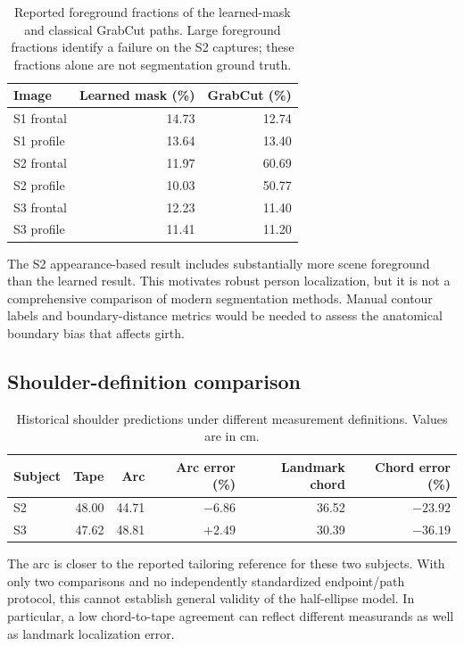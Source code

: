 \documentclass[11pt,a4paper]{article}
\numberwithin{equation}{section}
\begin{document}
\begin{table}[htbp]
\centering\small
\caption{Reported foreground fractions of the learned-mask and classical GrabCut paths. Large foreground fractions identify a failure on the S2 captures; these fractions alone are not segmentation ground truth.}
\label{tab:segmentation_comparison}
\begin{tabular}{lrr}
\toprule
Image & Learned mask (\%) & GrabCut (\%) \\
\midrule
S1 frontal & 14.73 & 12.74 \\
S1 profile & 13.64 & 13.40 \\
S2 frontal & 11.97 & 60.69 \\
S2 profile & 10.03 & 50.77 \\
S3 frontal & 12.23 & 11.40 \\
S3 profile & 11.41 & 11.20 \\
\bottomrule
\end{tabular}
\end{table}
The S2 appearance-based result includes substantially more scene foreground than the learned result. This motivates robust person localization, but it is not a comprehensive comparison of modern segmentation methods. Manual contour labels and boundary-distance metrics would be needed to assess the anatomical boundary bias that affects girth.

\subsection{Shoulder-definition comparison}
\begin{table}[htbp]
\centering\small
\caption{Historical shoulder predictions under different measurement definitions. Values are in cm.}
\label{tab:shoulder_comparison}
\begin{tabular}{lrrrrr}
\toprule
Subject & Tape & Arc & Arc error (\%) & Landmark chord & Chord error (\%) \\
\midrule
S2 & 48.00 & 44.71 & $-6.86$ & 36.52 & $-23.92$ \\
S3 & 47.62 & 48.81 & $+2.49$ & 30.39 & $-36.19$ \\
\bottomrule
\end{tabular}
\end{table}
The arc is closer to the reported tailoring reference for these two subjects. With only two comparisons and no independently standardized endpoint/path protocol, this cannot establish general validity of the half-ellipse model. In particular, a low chord-to-tape agreement can reflect different measurands as well as landmark localization error.
\end{document}
